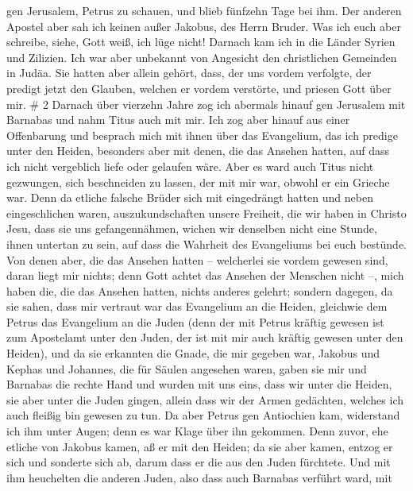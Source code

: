 gen Jerusalem, Petrus zu schauen, und blieb fünfzehn Tage bei ihm.
 Der anderen Apostel aber sah ich keinen außer Jakobus, des
Herrn Bruder.  Was ich euch aber schreibe, siehe, Gott
weiß, ich lüge nicht!  Darnach kam ich in die Länder Syrien
und Zilizien.  Ich war aber unbekannt von Angesicht den
christlichen Gemeinden in Judäa.  Sie hatten aber allein
gehört, dass, der uns vordem verfolgte, der predigt jetzt den Glauben,
welchen er vordem verstörte,  und priesen Gott über mir. \#
2  Darnach über vierzehn Jahre zog ich abermals hinauf gen
Jerusalem mit Barnabas und nahm Titus auch mit mir.  Ich zog
aber hinauf aus einer Offenbarung und besprach mich mit ihnen über das
Evangelium, das ich predige unter den Heiden, besonders aber mit denen,
die das Ansehen hatten, auf dass ich nicht vergeblich liefe oder
gelaufen wäre.  Aber es ward auch Titus nicht gezwungen,
sich beschneiden zu lassen, der mit mir war, obwohl er ein Grieche war.
 Denn da etliche falsche Brüder sich mit eingedrängt hatten
und neben eingeschlichen waren, auszukundschaften unsere Freiheit, die
wir haben in Christo Jesu, dass sie uns gefangennähmen, 
wichen wir denselben nicht eine Stunde, ihnen untertan zu sein, auf dass
die Wahrheit des Evangeliums bei euch bestünde.  Von denen
aber, die das Ansehen hatten -- welcherlei sie vordem gewesen sind,
daran liegt mir nichts; denn Gott achtet das Ansehen der Menschen nicht
--, mich haben die, die das Ansehen hatten, nichts anderes gelehrt;
 sondern dagegen, da sie sahen, dass mir vertraut war das
Evangelium an die Heiden, gleichwie dem Petrus das Evangelium an die
Juden  (denn der mit Petrus kräftig gewesen ist zum
Apostelamt unter den Juden, der ist mit mir auch kräftig gewesen unter
den Heiden),  und da sie erkannten die Gnade, die mir
gegeben war, Jakobus und Kephas und Johannes, die für Säulen angesehen
waren, gaben sie mir und Barnabas die rechte Hand und wurden mit uns
eins, dass wir unter die Heiden, sie aber unter die Juden gingen,
 allein dass wir der Armen gedächten, welches ich auch
fleißig bin gewesen zu tun.  Da aber Petrus gen Antiochien
kam, widerstand ich ihm unter Augen; denn es war Klage über ihn
gekommen.  Denn zuvor, ehe etliche von Jakobus kamen, aß er
mit den Heiden; da sie aber kamen, entzog er sich und sonderte sich ab,
darum dass er die aus den Juden fürchtete.  Und mit ihm
heuchelten die anderen Juden, also dass auch Barnabas verführt ward, mit
